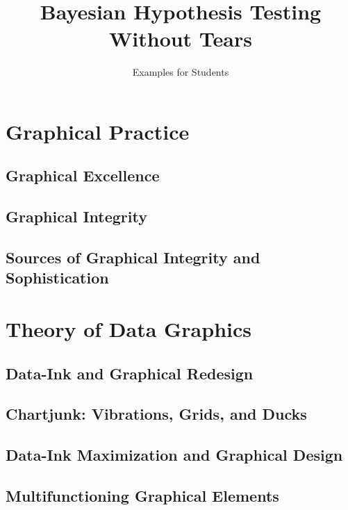 \documentclass{bayeshyp}
\title{Bayesian Hypothesis Testing Without Tears}
\subtitle{Examples for Students}
\begin{document}
\maketitle

\tableofcontents\thispagestyle{empty}

\mainmatter

\setcounter{secnumdepth}{4}

\part{Graphical Practice}
\chapter{Graphical Excellence}
\setcounter{page}{13}

\chapter{Graphical Integrity}
\setcounter{page}{53}

\chapter{Sources of Graphical Integrity and Sophistication}
\setcounter{page}{79}

\part{Theory of Data Graphics}

\chapter{Data-Ink and Graphical Redesign}
\setcounter{page}{91}

\chapter{Chartjunk: Vibrations, Grids, and Ducks}
\setcounter{page}{107}

\chapter{Data-Ink Maximization and Graphical Design}
\setcounter{page}{123}

\chapter{Multifunctioning Graphical Elements}
\setcounter{page}{139}
\end{document}
